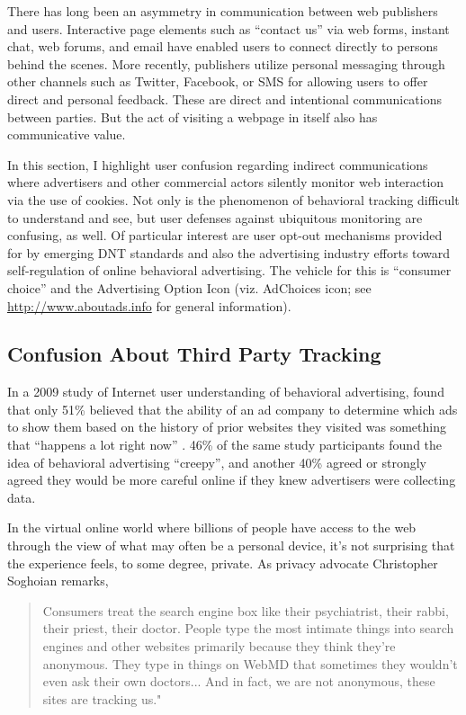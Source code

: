 There has long been an asymmetry in communication between web publishers and users. Interactive page elements such as ``contact us'' via web forms, instant chat, web forums, and email have enabled users to connect directly to persons behind the scenes. More recently, publishers utilize personal messaging through other channels such as Twitter, Facebook, or SMS for allowing users to offer direct and personal feedback. These are direct and intentional communications between parties. But the act of visiting a webpage in itself also has communicative value. 

In this section, I highlight user confusion regarding indirect communications where advertisers and other commercial actors silently monitor web interaction via the use of cookies. Not only is the phenomenon of behavioral tracking difficult to understand and see, but user defenses against ubiquitous monitoring are confusing, as well. Of particular interest are user opt-out mechanisms provided for by emerging DNT standards and also the advertising industry efforts toward self-regulation of online behavioral advertising. The vehicle for this is ``consumer choice'' and the Advertising Option Icon (viz. AdChoices icon; see  \url{http://www.aboutads.info} for general information).  

\subsection{Confusion About Third Party Tracking}
\label{confusionaboutthirdpartytracking}

In a 2009 study of Internet user understanding of behavioral advertising,  \cite{McDonald:2009vz}  found that only 51\% believed that the ability of an ad company to determine which ads to show them based on the history of prior websites they visited was something that ``happens a lot right now'' \citep{McDonald:2009vz}.  46\% of the same study participants found the idea of behavioral advertising ``creepy'', and another 40\% agreed or strongly agreed they would be more careful online if they knew advertisers were collecting data.

In the virtual online world where billions of people have access to the web through the view of what may often be a personal device, it's not surprising that the experience feels, to some degree, private. As privacy advocate Christopher Soghoian remarks,

\begin{quote}
Consumers treat the search engine box like their psychiatrist, their rabbi, their priest, their doctor. People type the most intimate things into search engines and other websites primarily because they think they're anonymous. They type in things on WebMD that sometimes they wouldn't even ask their own doctors... And in fact, we are not anonymous, these sites are tracking us." \citep[as cited in][]{Kessler:2010vq}
\end{quote}


